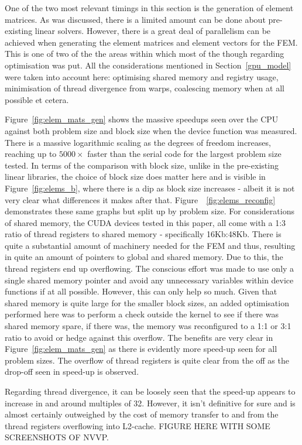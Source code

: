 One of the two most relevant timings in this section is the generation of element matrices. As was discussed, there is a limited amount can be done about pre-existing linear solvers. However, there is a great deal of parallelism can be achieved when generating the element matrices and element vectors for the FEM. This is one of two of the the areas within which most of the though regarding optimisation was put. All the considerations mentioned in Section~\ref{gpu_model} were taken into account here: optimising shared memory and registry usage, minimisation of thread divergence from warps, coalescing memory when at all possible et cetera.

Figure~\ref{fig:elem_mats_gen} shows the massive speedups seen over the CPU against both problem size and block size when the device function was measured. There is a massive logarithmic scaling as the degrees of freedom increases, reaching up to $5000\times$ faster than the serial code for the largest problem size tested. In terms of the comparison with block size, unlike in the pre-existing linear libraries, the choice of block size does matter here and is visible in Figure~\ref{fig:elems_b}, where there is a dip as block size increases - albeit it is not very clear what differences it makes after that. Figure~~\ref{fig:elems_reconfig} demonstrates these same graphs but split up by problem size. For considerations of shared memory, the CUDA devices tested in this paper, all come with a 1:3 ratio of thread registers to shared memory - specifically 16Kb:48Kb. There is quite a substantial amount of machinery needed for the FEM and thus, resulting in quite an amount of pointers to global and shared memory. Due to this, the thread registers end up overflowing. The conscious effort was made to use only a single shared memory pointer and avoid any unnecessary variables within device functions if at all possible. However, this can only help so much. Given that shared memory is quite large for the smaller block sizes, an added optimisation performed here was to perform a check outside the kernel to see if there was shared memory spare, if there was, the memory was reconfigured to a 1:1 or 3:1 ratio to avoid or hedge against this overflow. The benefits are very clear in Figure~\ref{fig:elem_mats_gen} as there is evidently more speed-up seen for all problem sizes. The overflow of thread registers is quite clear from the off as the drop-off seen in speed-up is observed.

Regarding thread divergence, it can be loosely seen that the speed-up appears to increase in and around multiples of 32. However, it isn't definitive for sure and is almost certainly outweighed by the cost of memory transfer to and from the thread registers overflowing into L2-cache. FIGURE HERE WITH SOME SCREENSHOTS OF NVVP.

